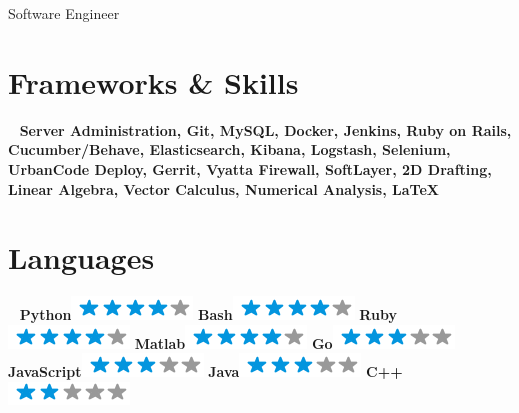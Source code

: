 \documentclass[]{fancy-resume}
\begin{document}
      {Software Engineer}
      

\begin{aside}
  \section{Frameworks \& Skills}
    ~
    \textbf{Server Administration, Git, MySQL, Docker, Jenkins, Ruby on Rails, Cucumber/Behave, Elasticsearch, Kibana, Logstash, Selenium, UrbanCode Deploy, Gerrit, Vyatta Firewall, SoftLayer, 2D Drafting, Linear Algebra, Vector Calculus, Numerical Analysis, \LaTeX}
    ~
  \section{Languages}
    ~
    \textbf{Python}\includegraphics[scale=0.40]{img/4stars.png}
    \textbf{Bash}\includegraphics[scale=0.40]{img/4stars.png}
    \textbf{Ruby}\includegraphics[scale=0.40]{img/4stars.png} 
    \textbf{Matlab}\includegraphics[scale=0.40]{img/4stars.png}
    \textbf{Go}\includegraphics[scale=0.40]{img/3stars.png}
    \textbf{JavaScript}\includegraphics[scale=0.40]{img/3stars.png}
    \textbf{Java}\includegraphics[scale=0.40]{img/3stars.png}
    \textbf{C++}\includegraphics[scale=0.40]{img/2stars.png}

\end{aside}
\end{document}
